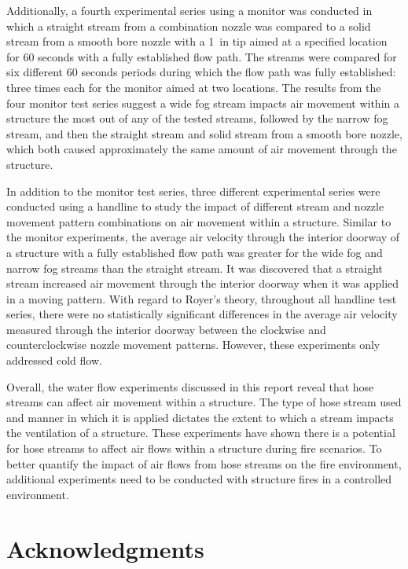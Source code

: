\documentclass[12pt,oneside]{book}
\begin{document}
Additionally, a fourth experimental series using a monitor was conducted in which a straight stream from a combination nozzle was compared to a solid stream from a smooth bore nozzle with a 1~in tip aimed at a specified location for 60 seconds with a fully established flow path. The streams were compared for six different 60 seconds periods during which the flow path was fully established: three times each for the monitor aimed at two locations. The results from the four monitor test series suggest a wide fog stream impacts air movement within a structure the most out of any of the tested streams, followed by the narrow fog stream, and then the straight stream and solid stream from a smooth bore nozzle, which both caused approximately the same amount of air movement through the structure.

In addition to the monitor test series, three different experimental series were conducted using a handline to study the impact of different stream and nozzle movement pattern combinations on air movement within a structure. Similar to the monitor experiments, the average air velocity through the interior doorway of a structure with a fully established flow path was greater for the wide fog and narrow fog streams than the straight stream. It was discovered that a straight stream increased air movement through the interior doorway when it was applied in a moving pattern. With regard to Royer's theory, throughout all handline test series, there were no statistically significant differences in the average air velocity measured through the interior doorway between the clockwise and counterclockwise nozzle movement patterns. However, these experiments only addressed cold flow.

Overall, the water flow experiments discussed in this report reveal that hose streams can affect air movement within a structure. The type of hose stream used and manner in which it is applied dictates the extent to which a stream impacts the ventilation of a structure. These experiments have shown there is a potential for hose streams to affect air flows within a structure during fire scenarios. To better quantify the impact of air flows from hose streams on the fire environment, additional experiments need to be conducted with structure fires in a controlled environment.

\chapter{Acknowledgments}
\label{chap:acknowledgments}
\end{document}
